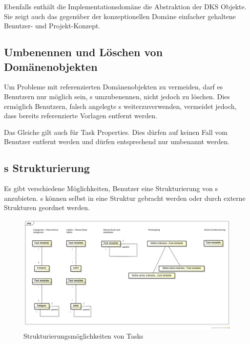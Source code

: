 			Ebenfalls enthält die Implementationsdomäne die Abstraktion der DKS Objekte.
			Sie zeigt auch das gegenüber der konzeptionellen Domäne einfacher gehaltene Benutzer- und Projekt-Konzept.
			
			
		\subsection{Umbenennen und Löschen von Domänenobjekten}
			Um Probleme mit referenzierten Domänenobjekten zu vermeiden,
			darf es Benutzern nur möglich sein, \ttpl s umzubenennen,
			nicht jedoch zu löschen.
			Dies ermöglich Benutzern, 
			falsch angelegte \ttpl s weiterzuverwenden, vermeidet jedoch, 
			dass bereits referenzierte Vorlagen entfernt werden.
			
			Das Gleiche gilt auch für Task Properties.
			Dies dürfen auf keinen Fall vom Benutzer entfernt werden 
			und dürfen entsprechend nur umbenannt werden.
			
		
		\subsection{\ttpl s Strukturierung}
			Es gibt verschiedene Möglichkeiten, 
			Benutzer eine Strukturierung von \ttpl s anzubieten.
			\ttpl s können selbst in eine Struktur gebracht werden
			oder durch externe Strukturen geordnet werden.
		
			\begin{figure}[H]
				\includegraphics[width=\textwidth]{architecture/media/img/taskTemplateStructure.png}
				\centering
				\caption{Strukturierungsmöglichkeiten von Tasks}
				\label{fig:taskTemplateStructure}
			\end{figure}
			
